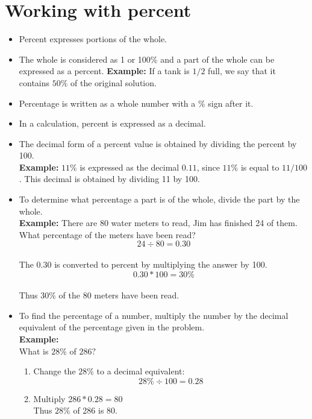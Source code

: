 \section{Working with percent}
\begin{itemize}
\item Percent expresses portions of the whole.  
\item The whole is considered as 1 or 100\% and a part of the whole can be expressed as a percent.
\textbf{Example:} If a tank is $1 / 2$ full, we say that it contains $50 \%$ of the original solution.
\item Percentage is written as a whole number with a \% sign after it. 
\item In a calculation, percent is expressed as a decimal. 
\item The decimal form of a percent value is obtained by dividing the percent by 100.\\
 \textbf{Example:} $11 \%$ is expressed as the decimal $0.11$, since $11 \%$ is equal to $11 / 100$. This decimal is obtained by dividing 11 by 100.
\item To determine what percentage a part is of the whole, divide the part by the whole.\\
\textbf{Example:} There are 80 water meters to read, Jim has finished 24 of them. What percentage of the meters have been read?\\
$$24 \div 80=0.30$$\\
The $0.30$ is converted to percent by multiplying the answer by 100.\\
$$0.30 * 100=30 \%$$\\
Thus $30 \%$ of the 80 meters have been read.\\

\item To find the percentage of a number, multiply the number by the decimal equivalent of the percentage given in the problem.\\
\textbf{Example:}\\
What is $28 \%$ of $286 ?$\\

\begin{enumerate}[Step 1.]
\item Change the $28 \%$ to a decimal equivalent:  $$28 \% \div 100=0.28$$
\item Multiply $286 * 0.28=80$\\
Thus $28 \%$ of 286 is 80.
\end{enumerate}


\end{itemize}
